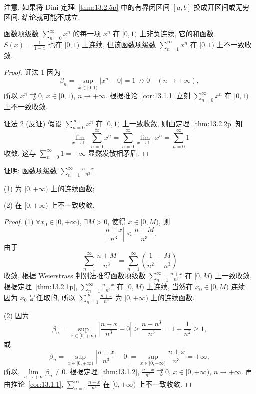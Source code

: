 注意, 如果将 Dini 定理~\ref{thm:13.2.5p} 中的有界闭区间 $[a,b]$ 换成开区间或无穷区间, 结论就可能不成立.

\begin{example}\label{ex:13.2.6}
函数项级数 $\sum_{n=0}^{\infty}x^{n}$ 的每一项 $x^{n}$ 在 $[0,1)$ 上非负连续, 它的和函数 $S(x)=\frac{1}{1-x}$ 也在 $[0,1)$ 上连续, 但该函数项级数 $\sum_{n=1}^{\infty}x^{n}$ 在 $[0,1)$ 上不一致收敛.
\end{example}

\begin{proof}
证法 1 因为
\[
  \beta_{n}=\sup_{x\in[0,1)}|x^{n}-0|=1\not\to0\quad(n\to+\infty),
\]
所以 $x^{n}\not\rightrightarrows0$, $x\in[0,1)$, $n\to+\infty$. 根据推论~\ref{cor:13.1.1} 立刻 $\sum_{n=0}^{\infty}x^{n}$ 在 $[0,1)$ 上不一致收敛.

证法 2 (反证) 假设 $\sum_{n=0}^{\infty}x^{n}$ 在 $[0,1)$ 上一致收敛, 则由定理~\ref{thm:13.2.2p} 知
\[
  \lim_{x\to1^{-}}\sum_{n=0}^{\infty}x^{n}=\sum_{n=0}^{\infty}\lim_{x\to1^{-}}x^{n}=\sum_{n=0}^{\infty}1
\]
收敛, 这与 $\sum_{n=0}^{\infty}1=+\infty$ 显然发散相矛盾.
\end{proof}

\begin{example}\label{ex:13.2.7}
证明: 函数项级数 $\sum_{n=1}^{\infty}\frac{n+x}{n^{3}}$

(1) 为 $[0,+\infty)$ 上的连续函数;

(2) 在 $[0,+\infty)$ 上不一致收敛.
\end{example}

\begin{proof}
(1) $\forall x_{0}\in[0,+\infty)$, $\exists M>0$, 使得 $x\in[0,M)$, 则
\[
  \left|\frac{n+x}{n^{3}}\right|\leqslant\frac{n+M}{n^{3}}.
\]
由于
\[
  \sum_{n=1}^{\infty}\frac{n+M}{n^{3}}=\sum_{n=1}^{\infty}\left(\frac{1}{n^{2}}+\frac{M}{n^{3}}\right)
\]
收敛, 根据 Weierstrass 判别法推得函数项级数 $\sum_{n=1}^{\infty}\frac{n+x}{n^{3}}$ 在 $[0,M)$ 上一致收敛, 根据定理~\ref{thm:13.2.1p}, $\sum_{n=1}^{\infty}\frac{n+x}{n^{3}}$ 在 $[0,M)$ 上连续, 当然在 $x_{0}\in[0,M)$ 连续. 因为 $x_{0}$ 是任取的, 所以 $\sum_{n=1}^{\infty}\frac{n+x}{n^{3}}$ 为 $[0,+\infty)$ 上的连续函数.

(2) 因为
\[
  \beta_{n}=\sup_{x\in[0,+\infty)}\left|\frac{n+x}{n^{3}}-0\right|\geqslant\frac{n+n^{3}}{n^{3}}=1+\frac{1}{n^{2}}\geqslant1,
\]
或
\[
  \beta_{n}=\sup_{x\in[0,+\infty)}\left|\frac{n+x}{n^{3}}-0\right|=\sup_{x\in[0,+\infty)}\frac{n+x}{n^{3}}=+\infty,
\]
所以, $\lim\limits_{n\to+\infty}\beta_{n}\neq0$. 根据定理~\ref{thm:13.1.2}, $\frac{n+x}{n^{3}}\not\rightrightarrows0$, $x\in[0,+\infty)$, $n\to+\infty$. 再由推论~\ref{cor:13.1.1}, $\sum_{n=1}^{\infty}\frac{n+x}{n^{3}}$ 在 $[0,+\infty)$ 上不一致收敛.
\end{proof}

